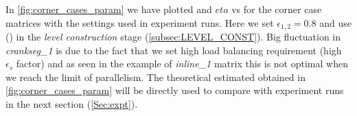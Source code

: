  In \cref{fig:corner_cases_param} we have plotted \threadEff and $eta$ vs \nthreads for the corner case matrices with the settings used in experiment runs. Here we set $\epsilon_{1,2}=0.8$ and use \RCM (\RCMfull) in the \emph{level construction} stage (\cref{subsec:LEVEL_CONST}). Big fluctuation in \emph{crankseg\_1} is due to the fact that we set high load balancing requirement (high $\epsilon_s$ factor) and as seen in the example of \emph{inline\_1} matrix this is not optimal when we reach the limit of parallelism. The theoretical estimated obtained in \cref{fig:corner_cases_param} will be directly used to compare with experiment runs in the next section (\cref{Sec:expt}).

